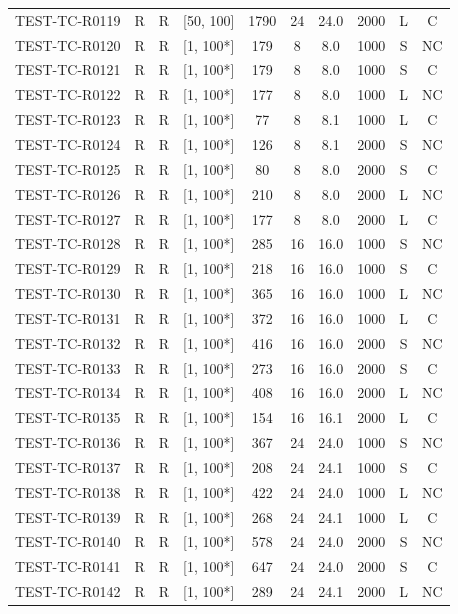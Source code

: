 \begin{longtable}{lccccccccc}
TEST-TC-R0119 & R & R & [50, 100] & 1790 & 24 & 24.0 & 2000 & L & C \\
TEST-TC-R0120 & R & R & [1, 100*] & 179 & 8 & 8.0 & 1000 & S & NC \\
TEST-TC-R0121 & R & R & [1, 100*] & 179 & 8 & 8.0 & 1000 & S & C \\
TEST-TC-R0122 & R & R & [1, 100*] & 177 & 8 & 8.0 & 1000 & L & NC \\
TEST-TC-R0123 & R & R & [1, 100*] & 77 & 8 & 8.1 & 1000 & L & C \\
TEST-TC-R0124 & R & R & [1, 100*] & 126 & 8 & 8.1 & 2000 & S & NC \\
TEST-TC-R0125 & R & R & [1, 100*] & 80 & 8 & 8.0 & 2000 & S & C \\
TEST-TC-R0126 & R & R & [1, 100*] & 210 & 8 & 8.0 & 2000 & L & NC \\
TEST-TC-R0127 & R & R & [1, 100*] & 177 & 8 & 8.0 & 2000 & L & C \\
TEST-TC-R0128 & R & R & [1, 100*] & 285 & 16 & 16.0 & 1000 & S & NC \\
TEST-TC-R0129 & R & R & [1, 100*] & 218 & 16 & 16.0 & 1000 & S & C \\
TEST-TC-R0130 & R & R & [1, 100*] & 365 & 16 & 16.0 & 1000 & L & NC \\
TEST-TC-R0131 & R & R & [1, 100*] & 372 & 16 & 16.0 & 1000 & L & C \\
TEST-TC-R0132 & R & R & [1, 100*] & 416 & 16 & 16.0 & 2000 & S & NC \\
TEST-TC-R0133 & R & R & [1, 100*] & 273 & 16 & 16.0 & 2000 & S & C \\
TEST-TC-R0134 & R & R & [1, 100*] & 408 & 16 & 16.0 & 2000 & L & NC \\
TEST-TC-R0135 & R & R & [1, 100*] & 154 & 16 & 16.1 & 2000 & L & C \\
TEST-TC-R0136 & R & R & [1, 100*] & 367 & 24 & 24.0 & 1000 & S & NC \\
TEST-TC-R0137 & R & R & [1, 100*] & 208 & 24 & 24.1 & 1000 & S & C \\
TEST-TC-R0138 & R & R & [1, 100*] & 422 & 24 & 24.0 & 1000 & L & NC \\
TEST-TC-R0139 & R & R & [1, 100*] & 268 & 24 & 24.1 & 1000 & L & C \\
TEST-TC-R0140 & R & R & [1, 100*] & 578 & 24 & 24.0 & 2000 & S & NC \\
TEST-TC-R0141 & R & R & [1, 100*] & 647 & 24 & 24.0 & 2000 & S & C \\
TEST-TC-R0142 & R & R & [1, 100*] & 289 & 24 & 24.1 & 2000 & L & NC \\

\end{longtable}
